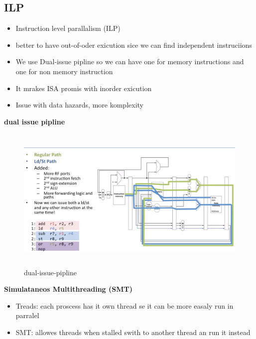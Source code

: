 \documentclass{article}
\begin{document}
\subsection{ILP}
\begin{itemize}
\item  Instruction level parallalism (ILP)
\item  better to have out-of-oder exicution sice we can find independent instruciions
\item  We use Dual-issue pipline so we can have one for memory instructions and
  one for non memory instruction
\item  It mrakes ISA promis with inorder exicution
\item  Issue with data hazards, more komplexity
\end{itemize}


\textbf{dual issue pipline}
\begin{figure}[h]
    \vspace{10mm}
    \centering
    \includegraphics[width=16cm, height=7cm]{image/dual-issue-pipline.png}
    \caption{dual-issue-pipline}
\end{figure}

\textbf{Simulataneos Multithreading (SMT)}
\begin{itemize}
\item  Treads: each proscess has it own thread se it can be more easaly run in parralel
\item  SMT: allowes threads when stalled swith to another thread an run it instead  
\end{itemize}
\end{document}
